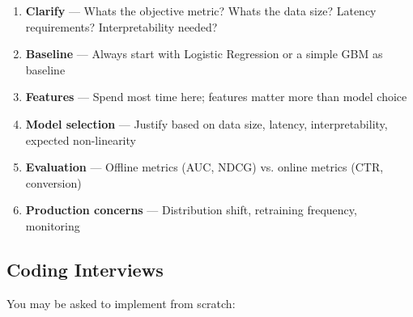 \documentclass[11pt]{article}
\providecommand{\tightlist}{\setlength{\itemsep}{1pt}\setlength{\parskip}{0pt}}
\begin{document}
\begin{enumerate}
\def\labelenumi{\arabic{enumi}.}
\tightlist
\item
  \textbf{Clarify} --- What\textquotesingle s the objective metric? What\textquotesingle s the data size? Latency requirements? Interpretability needed?
\item
  \textbf{Baseline} --- Always start with Logistic Regression or a simple GBM as baseline
\item
  \textbf{Features} --- Spend most time here; features matter more than model choice
\item
  \textbf{Model selection} --- Justify based on data size, latency, interpretability, expected non-linearity
\item
  \textbf{Evaluation} --- Offline metrics (AUC, NDCG) vs. online metrics (CTR, conversion)
\item
  \textbf{Production concerns} --- Distribution shift, retraining frequency, monitoring
\end{enumerate}

\subsection{Coding Interviews}\label{coding-interviews}

You may be asked to implement from scratch:

\end{document}
